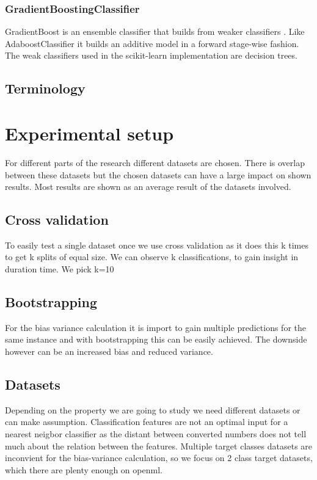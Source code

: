 \documentclass[a4paper,10pt]{article}
\begin{document}
\subsubsection{GradientBoostingClassifier}
GradientBoost is an ensemble classifier that builds from weaker classifiers \cite{GradientBoost}. Like AdaboostClassifier it builds an additive model in a forward stage-wise fashion.  The weak classifiers used in the scikit-learn implementation are decision trees.  %



\subsection{Terminology}

\newpage
\section{Experimental setup} \label{Chapter3}
For different parts of the research different datasets are chosen. There is overlap between these datasets but the chosen datasets can have a large impact on shown results. Most results are shown as an average result of the datasets involved.
\subsection{Cross validation} \label{cross-val}
To easily test a single dataset once we use cross validation as it does this k times to get k splits of equal size. We can observe k classifications, to gain insight in duration time. We pick k=10 

\subsection{Bootstrapping} \label{motivation}
For the bias variance calculation it is import to gain multiple predictions for the same instance and with bootstrapping this can be easily achieved. The downside however can be an increased bias and reduced variance.

\subsection{Datasets} \label{description}
Depending on the property we are going to study we need different datasets or can make assumption. Classification features are not an optimal input for a nearest neigbor classifier as the distant between converted numbers does not tell much about the relation between the features. Multiple target classes datasets are inconvient for the bias-variance calculation, so we focus on 2 class target datasets, which there are plenty enough on openml. 
\end{document}
